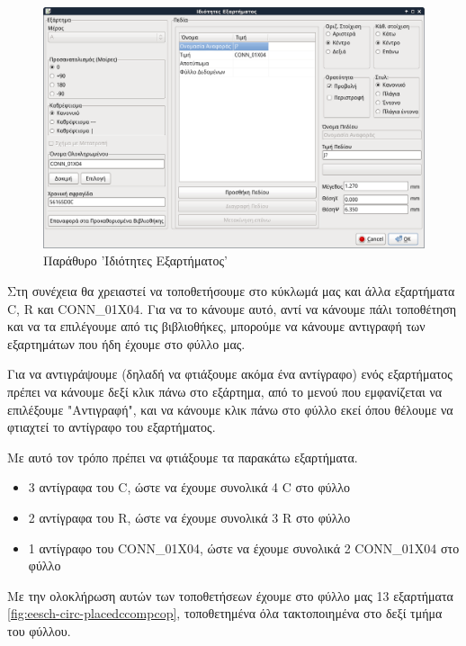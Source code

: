 \documentclass[a4paper]{article}
\begin{document}
\begin{figure}
  \begin{center}
    \includegraphics[width=.9\textwidth]{img/eeasch-dial-compprop.png}
    \caption{Παράθυρο 'Ιδιότητες Εξαρτήματος'}
    \label{fig:eeasch-dial-compprop}
  \end{center}
\end{figure}


Στη συνέχεια θα χρειαστεί να τοποθετήσουμε στο κύκλωμά μας και άλλα εξαρτήματα C, R και CONN\_01X04. Για να το κάνουμε αυτό, αντί να κάνουμε πάλι τοποθέτηση και να τα επιλέγουμε από τις βιβλιοθήκες, μπορούμε να κάνουμε αντιγραφή των εξαρτημάτων που ήδη έχουμε στο φύλλο μας. 

Για να αντιγράψουμε (δηλαδή να φτιάξουμε ακόμα ένα αντίγραφο) ενός εξαρτήματος πρέπει να κάνουμε δεξί κλικ πάνω στο εξάρτημα, από το μενού που εμφανίζεται να επιλέξουμε "Αντιγραφή", και να κάνουμε κλικ πάνω στο φύλλο εκεί όπου θέλουμε να φτιαχτεί το αντίγραφο του εξαρτήματος. 

Με αυτό τον τρόπο πρέπει να φτιάξουμε τα παρακάτω εξαρτήματα.

\begin{itemize}
    \item 3 αντίγραφα του C, ώστε να έχουμε συνολικά 4 C στο φύλλο
    \item 2 αντίγραφα του R, ώστε να έχουμε συνολικά 3 R στο φύλλο
    \item 1 αντίγραφο του CONN\_01X04, ώστε να έχουμε συνολικά 2 CONN\_01X04 στο φύλλο
\end{itemize}

Με την ολοκλήρωση αυτών των τοποθετήσεων έχουμε στο φύλλο μας 13 εξαρτήματα \ref{fig:eesch-circ-placedccompcop}, τοποθετημένα όλα τακτοποιημένα στο δεξί τμήμα του φύλλου.
\end{document}
